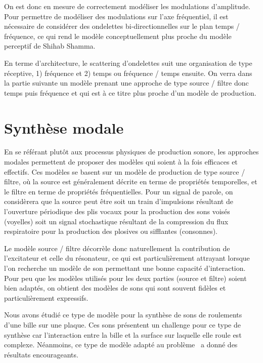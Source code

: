 On est donc en mesure de correctement modéliser les modulations d'amplitude. Pour permettre de modéliser des modulations sur l'axe fréquentiel, il est nécessaire de considérer des ondelettes bi-directionnelles sur le plan temps / fréquence, ce qui rend le modèle conceptuellement plus proche du modèle perceptif de Shihab Shamma.~\cite{8721532}

En terme d'architecture, le scattering d'ondelettes suit une organisation de type réceptive, 1) fréquence et 2) temps ou fréquence / temps ensuite. On verra dans la partie suivante un modèle prenant une approche de type source / filtre donc temps puis fréquence  et qui est à ce titre plus proche d'un modèle de production.

\section{ \nmu Synthèse modale}

En se référant plutôt aux processus physiques de production sonore, les approches modales permettent de proposer des modèles qui soient à la fois efficaces et effectifs. Ces modèles se basent sur un modèle de production de type source / filtre, où la source est généralement décrite en terme de propriétés temporelles, et le filtre en terme de propriétés fréquentielles. Pour un signal de parole, on considèrera que la source peut être soit un train d'impulsions résultant de l'ouverture périodique des plis vocaux pour la production des sons voisés (voyelles) soit un signal stochastique résultant de la compression du flux respiratoire pour la production des plosives ou sifflantes (consonnes).


Le modèle source / filtre décorrèle donc naturellement la contribution de l'excitateur et celle du résonateur, ce qui est particulièrement attrayant lorsque l'on recherche un modèle de son permettant une bonne capacité d'interaction. Pour peu que les modèles utilisés pour les deux parties (source et filtre) soient bien adaptés, on obtient des modèles de sons qui sont souvent fidèles et particulièrement expressifs.~\cite{aramaki2006analysis}

Nous avons étudié ce type de modèle pour la synthèse de sons de roulements d'une bille sur une plaque. Ces sons présentent un challenge pour ce type de synthèse car l'interaction entre la bille et la surface sur laquelle elle roule est complexe. Néanmoins, ce type de modèle adapté au problème~\cite{LagrangeTasslp10} a donné des résultats encourageants.~\cite{Murphy11a}

